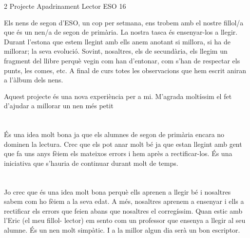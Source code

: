 %
%
\begin{news}
{2} %
{Projecte Apadrinament Lector}
{}
{ESO}
{16} %

 Els nens de segon d'ESO, un cop per setmana, ens trobem amb el nostre fillol/a que és un nen/a de segon de primària. La nostra tasca és ensenyar-los a llegir. Durant l'estona que estem llegint amb ells anem anotant  si millora, si ha de millorar; la seva evolució. Sovint, nosaltres, els de secundària, els llegim un fragment del llibre perquè vegin com han d'entonar, com s'han de respectar els punts, les comes, etc. 
 A final de curs totes les observacions que hem escrit aniran a l'àlbum dels nens.

 Aquest projecte és una nova experiència per a mi. M'agrada moltíssim el fet d'ajudar a millorar un nen més petit


\section*{}

 És una idea molt bona ja que els alumnes de segon de primària encara no dominen la lectura. Crec que els pot anar molt bé ja que estan llegint amb gent que fa uns anys fèiem els mateixos errors i hem après a rectificar-los.
És una iniciativa que s'hauria de continuar durant molt de temps.


\section*{}

 Jo crec que és una idea molt bona perquè ells aprenen a llegir bé i nosaltres sabem com ho fèiem a la seva edat. A més, nosaltres aprenem a ensenyar i ells a rectificar els errors que feien abans que nosaltres el corregíssim.
Quan estic amb l'Eric (el meu fillol- lector) em sento com un professor que ensenya a llegir al seu alumne. És un nen molt simpàtic. I a la millor algun dia serà un bon escriptor.

\end{news}
